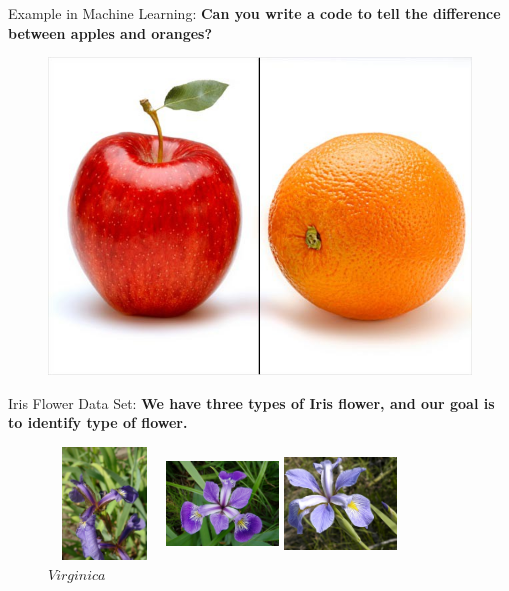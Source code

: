 \documentclass[11pt]{beamer}
\begin{document}
\begin{frame}{Example in Machine Learning:}
\textbf{Can you write a code to tell the difference between apples and oranges?}
\begin{center}
\begin{figure}[H]
\includegraphics[scale=0.3]{2}
\end{figure}
\end{center}
\end{frame}
\begin{frame}{Iris Flower Data Set:}
\textbf{We have three types of Iris flower, and our goal is to identify type of flower.}

\begin{figure}[!htb]
  \includegraphics[width=3cm,height=3cm]{setosa}
  \caption{$\textit{Setosa}$}
\endminipage\hfill
{}
  \includegraphics[width=3cm,height=3cm]{versicolor}
  \caption{$\textit{Versicolor}$}
\endminipage\hfill
{}%
  \includegraphics[width=3cm,height=3cm]{virginica}
  \caption{$\textit{Virginica}$}
\endminipage
\end{figure}
\end{frame}
\end{document}
